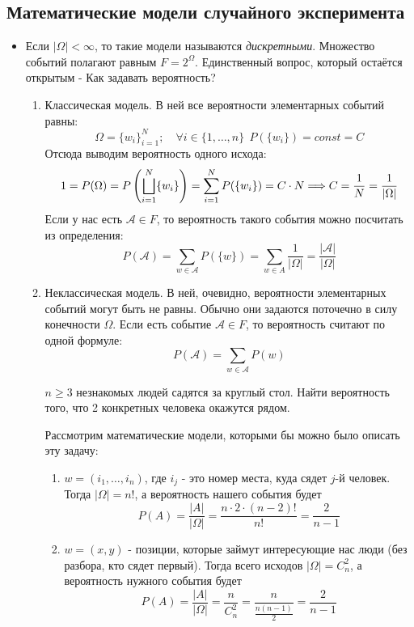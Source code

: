 \subsection{Математические модели случайного эксперимента}

\begin{itemize}
	\item Если $|\Omega| < \infty$, то такие модели называются \textit{дискретными}. Множество событий полагают равным $F = 2^\Omega$. Единственный вопрос, который остаётся открытым - Как задавать вероятность?
	\begin{enumerate}
		\item Классическая модель. В ней все вероятности элементарных событий равны:
		\[
			\Omega = \{w_i\}_{i = 1}^N; \quad \forall i \in \{1, \ldots, n\}\ \ P(\{w_i\}) = const = C
		\]
		Отсюда выводим вероятность одного исхода:
		\[
			1 = P(\Omega) = P\left(\bigsqcup_{i = 1}^N \{w_i\}\right) = \sum_{i = 1}^N P(\{w_i\}) = C \cdot N \Longrightarrow C = \frac{1}{N} = \frac{1}{|\Omega|}
		\]
		Если у нас есть $\mathcal{A} \in F$, то вероятность такого события можно посчитать из определения:
		\[
			P(\mathcal{A}) = \sum_{w \in \mathcal{A}} P(\{w\}) = \sum_{w \in A} \frac{1}{|\Omega|} = \frac{|\mathcal{A}|}{|\Omega|}
		\]
		
		\item Неклассическая модель. В ней, очевидно, вероятности элементарных событий могут быть не равны. Обычно они задаются поточечно в силу конечности $\Omega$. Если есть событие $\mathcal{A} \in F$, то вероятность считают по одной формуле:
		\[
			P(\mathcal{A}) = \sum_{w \in \mathcal{A}} P({w})
		\]
		
		\begin{example}
			$n \ge 3$ незнакомых людей садятся за круглый стол. Найти вероятность того, что 2 конкретных человека окажутся рядом.
			
			Рассмотрим математические модели, которыми бы можно было описать эту задачу:
			\begin{enumerate}
				\item $w = (i_1, \ldots, i_n)$, где $i_j$ - это номер места, куда сядет $j$-й человек. Тогда $|\Omega| = n!$, а вероятность нашего события будет
				\[
					P(A) = \frac{|A|}{|\Omega|} = \frac{n \cdot 2 \cdot (n - 2)!}{n!} = \frac{2}{n - 1}
				\]
				
				\item $w = (x, y)$ - позиции, которые займут интересующие нас люди (без разбора, кто сядет первый). Тогда всего исходов $|\Omega| = C_n^2$, а вероятность нужного события будет
				\[
					P(A) = \frac{|A|}{|\Omega|} = \frac{n}{C_n^2} = \frac{n}{\frac{n(n - 1)}{2}} = \frac{2}{n - 1}
				\]
			\end{enumerate}
		\end{example}
	

\end{enumerate}
\end{itemize}
